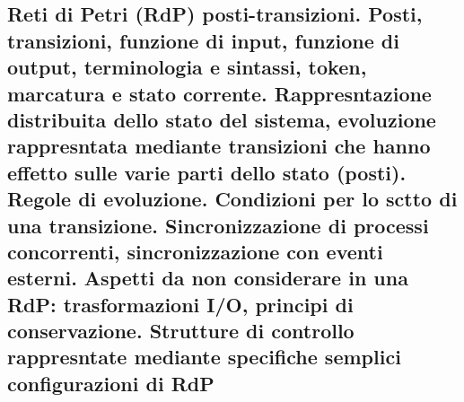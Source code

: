 \subsection{Reti di Petri (RdP) posti-transizioni. Posti, transizioni, funzione di input, funzione di output, terminologia e sintassi, token, marcatura e stato corrente. Rappresntazione distribuita dello stato del sistema, evoluzione rappresntata mediante transizioni che hanno effetto sulle varie parti dello stato (posti). Regole di evoluzione. Condizioni per lo sctto di una transizione. Sincronizzazione di processi concorrenti, sincronizzazione con eventi esterni. Aspetti da non considerare in una RdP: trasformazioni I/O, principi di conservazione. Strutture di controllo rappresntate mediante specifiche semplici configurazioni di RdP}